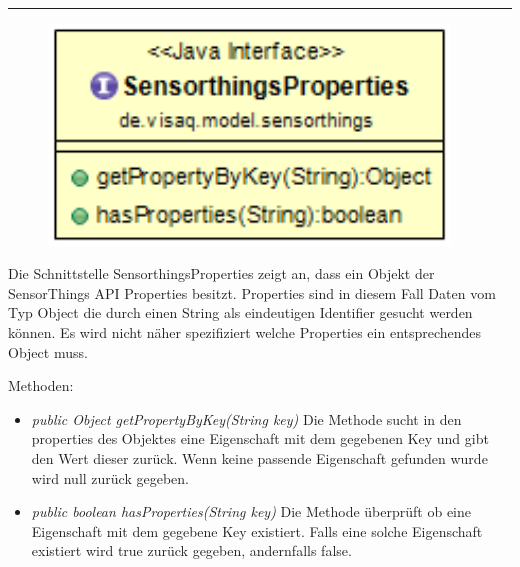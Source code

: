 \rule{\textwidth}{0.4pt}
\begin{minipage}{0.4\textwidth}
    \begin{figure}[H]
        {\centering\includegraphics[width=0.95\textwidth]{media/backend/modell/classes/SensorthingsProperties.png}}
    \end{figure}
    \end{minipage} \hfill
\begin{minipage}{0.6\textwidth}
Die Schnittstelle SensorthingsProperties zeigt an, dass ein Objekt der \gls{SensorThings API} Properties besitzt.
Properties sind in diesem Fall Daten vom Typ Object die durch einen String als eindeutigen Identifier gesucht werden können.
Es wird nicht näher spezifiziert welche Properties ein entsprechendes Object muss.
\end{minipage}

Methoden: \begin{itemize}
    \item \emph{public Object getPropertyByKey(String key)} Die Methode sucht in den properties des Objektes eine Eigenschaft mit dem gegebenen Key und gibt den Wert dieser zurück.
    Wenn keine passende Eigenschaft gefunden wurde wird null zurück gegeben.
    \item \emph{public boolean hasProperties(String key)} Die Methode überprüft ob eine Eigenschaft mit dem gegebene Key existiert.
    Falls eine solche Eigenschaft existiert wird true zurück gegeben, andernfalls false.
\end{itemize}

